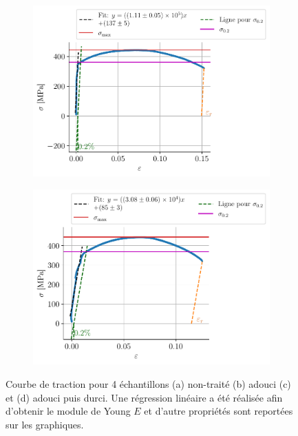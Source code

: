 \begin{figure}
\begin{subfigure}{0.48\linewidth}
        \caption{}
        \label{fig:chaud4}
    \end{subfigure}
    \begin{subfigure}{0.48\linewidth}
        \centering
        \includegraphics[width=\linewidth]{figures/tiede5all.pdf}
        \caption{}
        \label{fig:tiede5}
    \end{subfigure}
    \begin{subfigure}{0.48\linewidth}
        \centering
        \includegraphics[width=\linewidth]{figures/tiede7all.pdf}
        \caption{}
        \label{fig:tiede7}
    \end{subfigure}
    \caption{Courbe de traction pour 4 échantillons (a) non-traité (b) adouci (c) et (d) adouci puis durci. Une régression linéaire a été réalisée afin d'obtenir le module de Young \(E\) et d'autre propriétés sont reportées sur les graphiques.}
    \label{fig:lots_of_fig}
\end{figure}